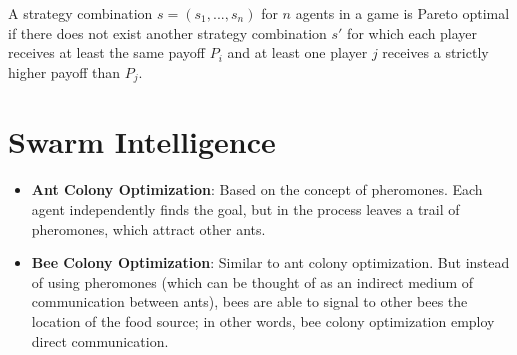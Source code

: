 \documentclass[twocolumn]{article}
\theoremstyle{plain}
\begin{document}
\begin{concept}
    A strategy combination $s = (s_1, ..., s_n)$ for $n$ agents in a game is Pareto optimal if there does not exist another strategy combination $s'$ for which each player receives at least the same payoff $P_i$ and at least one player $j$ receives a strictly higher payoff than $P_j$.
\end{concept}

\section{Swarm Intelligence}

\begin{itemize}
    \item \textbf{Ant Colony Optimization}: Based on the concept of pheromones. Each agent independently finds the goal, but in the process leaves a trail of pheromones, which attract other ants.
    \item \textbf{Bee Colony Optimization}: Similar to ant colony optimization. But instead of using pheromones (which can be thought of as an indirect medium of communication between ants), bees are able to signal to other bees the location of the food source; in other words, bee colony optimization employ direct communication.
\end{itemize}
\end{document}
